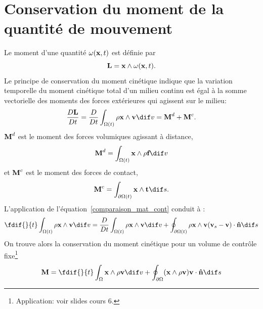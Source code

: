 \section{Conservation du moment de la quantité de mouvement}
Le moment d'une quantité $\omega(\textbf{x},t)$ est définie par $$\textbf{L}=\textbf{x}\wedge\omega(\textbf{x},t).$$
Le principe de conservation du moment cinétique indique que la variation temporelle du moment cinétique total  d'un milieu continu est égal à la somme vectorielle des moments des forces extérieures qui agissent sur le milieu:
$$\frac{D\fv{L}}{Dt}=\frac{D}{Dt}\int_{\Omega (t)}\rho\fv{x}\wedge\fv{v} \dif v=\fv{M}^d+\fv{M}^c.$$
$\textbf{M}^d$ est le moment des forces volumiques agissant à distance, $$\fv{M}^d=\int_{\Omega (t)}\fv{x}\wedge\rho\fv{f} \dif v$$ et $\textbf{M}^c$ est le moment des forces de contact,
$$\fv{M}^c=\int_{\partial\Omega (t)}\fv{x}\wedge\fv{t} \dif s.$$
L'application de l'équation~\eqref{comparaison_mat_cont} conduit à :
$$\fdif{}{t}\int_{\Omega (t)}\rho\fv{x}\wedge\fv{v} \dif v=\frac{D}{Dt}\int_{\Omega (t)}\rho\fv{x}\wedge\fv{v} \dif v+\oint_{\partial\Omega (t)}\rho\fv{x}\wedge\fv{v}(\fv{v}_s-\fv{v})\cdot\fv{\^n} \dif s$$
On trouve alors la conservation du moment cinétique pour un volume de contrôle fixe\footnote{Application: voir slides cours 6.}
$$\fv{M}=\fdif{}{t}\int_{\Omega}\fv{x}\wedge\rho\fv{v} \dif v+\oint_{\partial\Omega }(\fv{x}\wedge\rho\fv{v})\fv{v}\cdot\fv{\^n} \dif s$$
